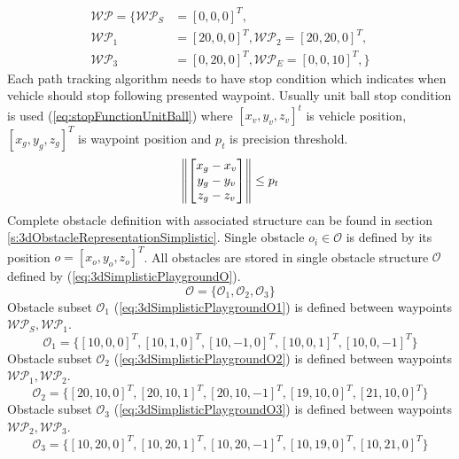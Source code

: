 \begin{equation}\label{eq:playground3DSimpleWPSet}
    \begin{aligned}
          \mathscr{WP} = \{ \mathscr{WP}_S &=[0,0,0]^T,\\
                            \mathscr{WP}_1 &=[20,0,0]^T,
                            \mathscr{WP}_2 =[20,20,0]^T,\\
                            \mathscr{WP}_3 &=[0,20,0]^T,
                            \mathscr{WP}_E =[0,0,10]^T,\}
    \end{aligned}
\end{equation}
\noindent Each path tracking algorithm needs to have stop condition which indicates when vehicle should stop following presented waypoint. Usually unit ball stop condition is used (\ref{eq:stopFunctionUnitBall}) where $[x_v,y_v,z_v]^t$ is vehicle position, $[x_g,y_g,z_g]^T$ is waypoint position and $p_t$ is precision threshold.
\begin{equation}\label{eq:stopFunctionUnitBall}
    \left\lVert\begin{bmatrix}x_g-x_v\\y_g-y_v\\z_g-z_v\end{bmatrix}\right\rVert \le p_t
\end{equation}
Complete obstacle definition with associated structure can be found in section \ref{s:3dObstacleRepresentationSimplistic}. Single obstacle $o_i\in\mathscr{O}$ is defined by its position $o=[x_o,y_o,z_o]^T$. All obstacles are stored in single obstacle structure $\mathscr{O}$ defined by (\ref{eq:3dSimplisticPlaygroundO}).
\begin{equation}\label{eq:3dSimplisticPlaygroundO}
    \mathscr{O} = \{\mathscr{O}_1,\mathscr{O}_2,\mathscr{O}_3\}
\end{equation}
Obstacle subset $\mathscr{O}_1$ (\ref{eq:3dSimplisticPlaygroundO1}) is defined between waypoints $\mathscr{WP}_S,\mathscr{WP}_1$.
\begin{equation}\label{eq:3dSimplisticPlaygroundO1}
    \mathscr{O}_1 = \{[10,0,0]^T,[10,1,0]^T,[10,-1,0]^T,[10,0,1]^T,[10,0,-1]^T\}
\end{equation}
Obstacle subset $\mathscr{O}_2$ (\ref{eq:3dSimplisticPlaygroundO2}) is defined between waypoints $\mathscr{WP}_1,\mathscr{WP}_2$.
\begin{equation}\label{eq:3dSimplisticPlaygroundO2}
    \mathscr{O}_2 = \{[20,10,0]^T,[20,10,1]^T,[20,10,-1]^T,[19,10,0]^T,[21,10,0]^T\}
\end{equation}
Obstacle subset $\mathscr{O}_3$ (\ref{eq:3dSimplisticPlaygroundO3}) is defined between waypoints $\mathscr{WP}_2,\mathscr{WP}_3$.
\begin{equation}\label{eq:3dSimplisticPlaygroundO3}
    \mathscr{O}_3 = \{[10,20,0]^T,[10,20,1]^T,[10,20,-1]^T,[10,19,0]^T,[10,21,0]^T\}
\end{equation}

